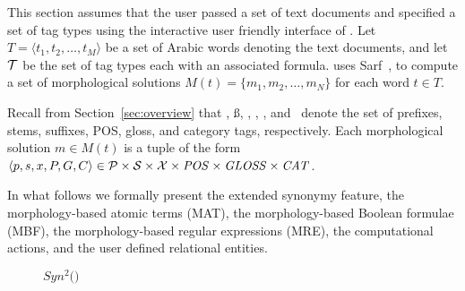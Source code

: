This section assumes that the user passed a set of text documents and 
specified a set of tag types using the interactive user friendly
interface of \framework. 
Let $T=\langle t_1,t_2,\ldots,t_M\rangle$ be a set of Arabic words denoting the 
text documents, and let ${\cal T}$  be the 
set of tag types each with an associated formula. 
\framework uses Sarf~\cite{ZaMaColing2012DemosSarf},
to compute a set of morphological solutions $M(t)=\{m_1,m_2,\ldots,m_N\}$
for each word $t\in T$. 

Recall from Section~\ref{sec:overview} 
that \pp, \ss, \xx, \PP, \GG, and \AC~denote the set of prefixes, stems, 
suffixes, POS, gloss, and category tags, respectively. 
Each morphological solution $m\in M(t)$ is a tuple of the form 
$\langle p,s,x,P,G,C\rangle\in \pp \times  \ss\times \xx\times \PP\times\GG \times \AC$.

In what follows we formally present 
the extended synonymy feature, 
the morphology-based atomic terms (MAT), 
the morphology-based Boolean formulae (MBF), 
the morphology-based regular expressions (MRE), 
the computational actions, and the user defined relational entities.
 
%

\begin{figure}[tb!]
\begin{center}
\vspace{-2em}
\caption{$Syn^2($$)$}
\vspace{-3em}
\label{fig:introsynEx}
\end{center}
\end{figure}


